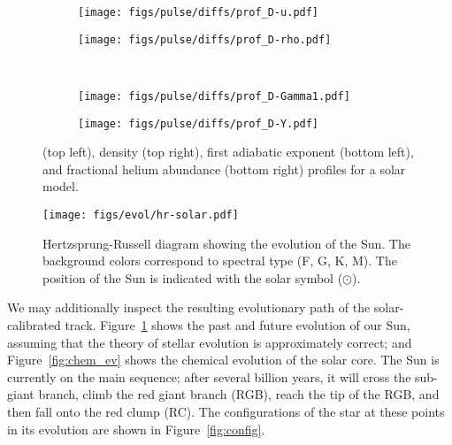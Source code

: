 \begin{figure}
    \centering
    \begin{subfigure}[b]{0.5\linewidth}
        \centering
        \texttt{[image: figs/pulse/diffs/prof\_D-u.pdf]}
    \end{subfigure}%
    \begin{subfigure}[b]{0.5\linewidth}
        \centering
        \texttt{[image: figs/pulse/diffs/prof\_D-rho.pdf]}%
    \end{subfigure}\\
    \begin{subfigure}[b]{0.5\linewidth}
        \centering
        \texttt{[image: figs/pulse/diffs/prof\_D-Gamma1.pdf]}%
    \end{subfigure}%
    \begin{subfigure}[b]{0.5\linewidth}
        \centering
        \texttt{[image: figs/pulse/diffs/prof\_D-Y.pdf]}%
    \end{subfigure}
    \caption[The Sun's internal mechanical, thermal, and chemical profile]{ (top left), density (top right), first adiabatic exponent (bottom left), and fractional helium abundance (bottom right) profiles for a solar model. 
    \label{fig:profs} } 
    \vspace*{1cm}
    \texttt{[image: figs/evol/hr-solar.pdf]}
    \caption[Solar H-R Diagram]{Hertzsprung-Russell diagram showing the evolution of the Sun. 
    The background colors correspond to spectral type (F, G, K, M). 
    The position of the Sun is indicated with the solar symbol ($\odot$). 
    \label{fig:solar-HR}}
\end{figure}


We may additionally inspect the resulting evolutionary path of the solar-calibrated track. 
Figure~\ref{fig:solar-HR} shows the past and future evolution of our Sun, assuming that the theory of stellar evolution is approximately correct; and Figure~\ref{fig:chem_ev} shows the chemical evolution of the solar core. 
The Sun is currently on the main sequence; after several billion years, it will cross the sub-giant branch, climb the red giant branch (RGB), reach the tip of the RGB, and then fall onto the red clump (RC). 
The configurations of the star at these points in its evolution are shown in Figure~\ref{fig:config}. 

